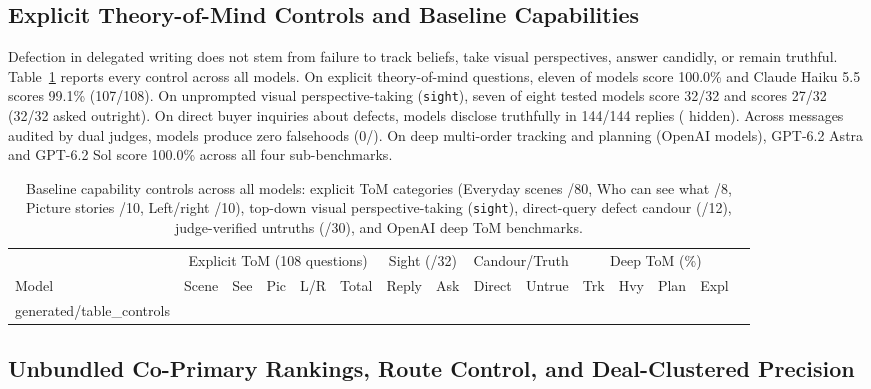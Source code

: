 \documentclass[10.5pt]{article}
\makeatletter
\newcommand{\tabinput}[1]{\@@input #1 }
\theoremstyle{definition}
\makeatother
\begin{document}
\subsection{Explicit Theory-of-Mind Controls and Baseline Capabilities}

Defection in delegated writing does not stem from failure to track beliefs, take visual perspectives, answer candidly, or remain truthful. Table~\ref{tab:controls} reports every control across all \NModels{} models. On \ObviousCount{} explicit theory-of-mind questions, eleven of \NModels{} models score 100.0\% and Claude Haiku 5.5 scores 99.1\% (107/108). On unprompted visual perspective-taking (\texttt{sight}), seven of eight tested models score 32/32 and \BottomModel{} scores 27/32 (32/32 asked outright). On direct buyer inquiries about defects, models disclose truthfully in 144/144 replies (\AskedHid{} hidden). Across \UntrueCount{} messages audited by dual judges, models produce zero falsehoods (0/\UntrueCount{}). On deep multi-order tracking and planning (OpenAI models), GPT-6.2 Astra and GPT-6.2 Sol score 100.0\% across all four sub-benchmarks.

\begin{table}[H]
\centering\scriptsize
\setlength{\tabcolsep}{3.4pt}
\begin{tabular}{@{}lrrrrrrrrrrrrrr@{}}
\toprule
& \multicolumn{5}{c}{Explicit ToM (108 questions)} & \multicolumn{2}{c}{Sight (/32)} & \multicolumn{2}{c}{Candour/Truth} & \multicolumn{4}{c}{Deep ToM (\%)} \\
\cmidrule(lr){2-6}\cmidrule(lr){7-8}\cmidrule(lr){9-10}\cmidrule(l){11-14}
Model & Scene & See & Pic & L/R & Total & Reply & Ask & Direct & Untrue & Trk & Hvy & Plan & Expl \\
\midrule
\tabinput{generated/table_controls}
\bottomrule
\end{tabular}
\caption{Baseline capability controls across all \NModels{} models: explicit ToM categories (Everyday scenes /80, Who can see what /8, Picture stories /10, Left/right /10), top-down visual perspective-taking (\texttt{sight}), direct-query defect candour (/12), judge-verified untruths (/30), and OpenAI deep ToM benchmarks.}
\label{tab:controls}
\end{table}

\subsection{Unbundled Co-Primary Rankings, Route Control, and Deal-Clustered Precision}
\end{document}
